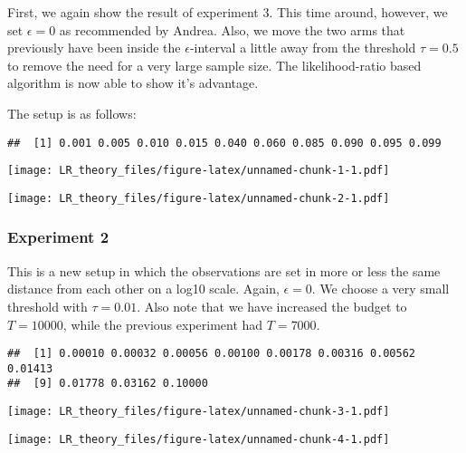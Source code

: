 \documentclass[12pt,]{article}
\begin{document}
First, we again show the result of experiment 3. This time around,
however, we set \(\epsilon = 0\) as recommended by Andrea. Also, we move
the two arms that previously have been inside the \(\epsilon\)-interval
a little away from the threshold \(\tau = 0.5\) to remove the need for a
very large sample size. The likelihood-ratio based algorithm is now able
to show it's advantage.

The setup is as follows:

\begin{verbatim}
##  [1] 0.001 0.005 0.010 0.015 0.040 0.060 0.085 0.090 0.095 0.099
\end{verbatim}

\texttt{[image: LR\_theory\_files/figure-latex/unnamed-chunk-1-1.pdf]}

\texttt{[image: LR\_theory\_files/figure-latex/unnamed-chunk-2-1.pdf]}

\subsubsection{Experiment 2}\label{experiment-2}

This is a new setup in which the observations are set in more or less
the same distance from each other on a log10 scale. Again,
\(\epsilon = 0\). We choose a very small threshold with \(\tau = 0.01\).
Also note that we have increased the budget to \(T=10000\), while the
previous experiment had \(T=7000\).

\begin{verbatim}
##  [1] 0.00010 0.00032 0.00056 0.00100 0.00178 0.00316 0.00562 0.01413
##  [9] 0.01778 0.03162 0.10000
\end{verbatim}

\texttt{[image: LR\_theory\_files/figure-latex/unnamed-chunk-3-1.pdf]}

\texttt{[image: LR\_theory\_files/figure-latex/unnamed-chunk-4-1.pdf]}
\end{document}
